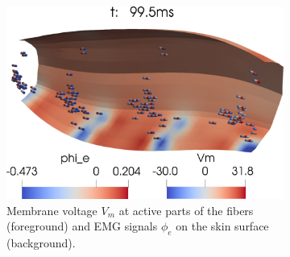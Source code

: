 \begin{figure}[H]
  \centering%
  \begin{subfigure}[t]{0.7\textwidth}%
    \centering%
    \includegraphics[width=\textwidth]{images/results/application/mu01a.png}%
    \caption{Membrane voltage $V_m$ at active parts of the fibers (foreground) and EMG signals $\phi_e$ on the skin surface (background).}%
    \label{fig:mu01a}%
  \end{subfigure} \,
  \begin{subfigure}[t]{0.25\textwidth}%
    \centering%

\end{subfigure}
\end{figure}
